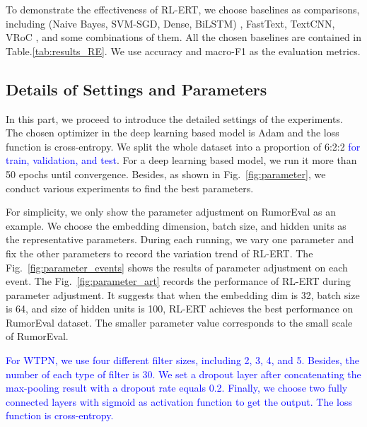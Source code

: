 \documentclass[review]{elsarticle}
\begin{document}
To demonstrate the effectiveness of RL-ERT, we choose baselines as comparisons, including (Naive Bayes, SVM-SGD, Dense, BiLSTM) \cite{DBLP:conf/emnlp/QazvinianRRM11}, FastText\cite{DBLP:conf/eacl/GraveMJB17}, TextCNN\cite{DBLP:conf/emnlp/Kim14}, VRoC \cite{DBLP:conf/www/ChengNB20}, and some combinations of them. All the chosen baselines are contained in Table.\ref{tab:results_RE}. We use accuracy and macro-F1 as the evaluation metrics.

\subsection{Details of Settings and Parameters}
In this part, we proceed to introduce the detailed settings of the experiments. The chosen optimizer in the deep learning based model is Adam and the loss function is cross-entropy. We split the whole dataset into a proportion of 6:2:2 \textcolor{blue}{for train, validation, and test}. For a deep learning based model, we run it more than 50 epochs until convergence. Besides, as shown in Fig.~\ref{fig:parameter}, we conduct various experiments to find the best parameters.

For simplicity, we only show the parameter adjustment on RumorEval as an example. We choose the embedding dimension, batch size, and hidden units as the representative parameters. During each running, we vary one parameter and fix the other parameters to record the variation trend of RL-ERT. The Fig.~\ref{fig:parameter_events} shows the results of parameter adjustment on each event. The Fig.~\ref{fig:parameter_art} records the performance of RL-ERT during parameter adjustment. It suggests that when the embedding dim is 32, batch size is 64, and size of hidden units is 100, RL-ERT achieves the best performance on RumorEval dataset. The smaller parameter value corresponds to the small scale of RumorEval.

\textcolor{blue}{For WTPN, we use four different filter sizes, including 2, 3, 4, and 5. Besides, the number of each type of filter is 30. We set a dropout layer after concatenating the max-pooling result with a dropout rate equals 0.2. Finally, we choose two fully connected layers with sigmoid as activation function to get the output. The loss function is cross-entropy.} 
\end{document}
